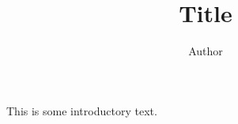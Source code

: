 \documentclass[stu,12pt,a4paper,biblatex,floatsintext]{apa7}
\title{Title}
\author{Author}
\affiliation{Affiliation}
\begin{document}
\maketitle

This is some introductory text.

\printbibliography
\end{document}
